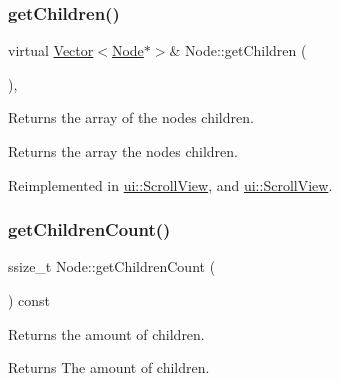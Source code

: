 \mbox{\label{classNode_a25943a94b19e37929b18f93647b58153}} 
\subsubsection{\texorpdfstring{get\+Children()}{getChildren()}\hspace{0.1cm}{\footnotesize\ttfamily [2/2]}}
{\footnotesize\ttfamily virtual \hyperlink{classVector}{Vector}$<$\hyperlink{classNode}{Node}$\ast$$>$\& Node\+::get\+Children (\begin{DoxyParamCaption}{ }\end{DoxyParamCaption})\hspace{0.3cm}{\ttfamily [inline]}, {\ttfamily [virtual]}}

Returns the array of the node\textquotesingle{}s children.

\begin{DoxyReturn}{Returns}
the array the node\textquotesingle{}s children. 
\end{DoxyReturn}


Reimplemented in \hyperlink{classui_1_1ScrollView_adf13c7fc4c49dc4030dd4482f7de62b7}{ui\+::\+Scroll\+View}, and \hyperlink{classui_1_1ScrollView_abde6bf60f60db8d75ac5a63aa0f47dbc}{ui\+::\+Scroll\+View}.

\mbox{\label{classNode_abe0559adacadcb3a367c8cf7ba65730e}} 
\subsubsection{\texorpdfstring{get\+Children\+Count()}{getChildrenCount()}\hspace{0.1cm}{\footnotesize\ttfamily [1/2]}}
{\footnotesize\ttfamily ssize\+\_\+t Node\+::get\+Children\+Count (\begin{DoxyParamCaption}{ }\end{DoxyParamCaption}) const\hspace{0.3cm}{\ttfamily [virtual]}}

Returns the amount of children.

\begin{DoxyReturn}{Returns}
The amount of children. 
\end{DoxyReturn}


